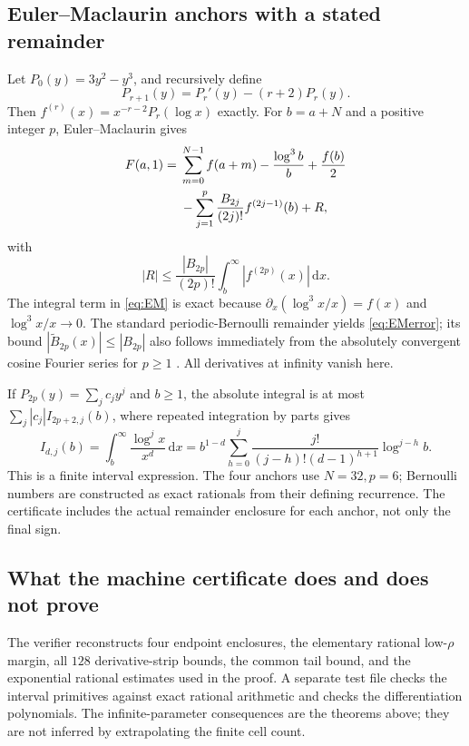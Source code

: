 \documentclass[11pt]{article}
\numberwithin{equation}{section}
\theoremstyle{definition}
\newcommand{\dd}{\,\mathrm d}
\begin{document}
\subsection{Euler--Maclaurin anchors with a stated remainder}
Let $P_0(y)=3y^2-y^3$, and recursively define
\begin{equation}\label{eq:polyrec}
 P_{r+1}(y)=P_r'(y)-(r+2)P_r(y).
\end{equation}
Then $f^{(r)}(x)=x^{-r-2}P_r(\log x)$ exactly.
For $b=a+N$ and a positive integer $p$, Euler--Maclaurin gives
\begin{align}\label{eq:EM}
 F(a,1)={}&\sum_{m=0}^{N-1}f(a+m)-\frac{\log^3b}{b}
 +\frac{f(b)}2\notag\\
 &-\sum_{j=1}^p\frac{B_{2j}}{(2j)!}f^{(2j-1)}(b)+R,
\end{align}
with
\begin{equation}\label{eq:EMerror}
 |R|\leq\frac{|B_{2p}|}{(2p)!}
                 \int_b^\infty |f^{(2p)}(x)|\dd x.
\end{equation}
The integral term in \eqref{eq:EM} is exact because
$\partial_x(\log^3x/x)=f(x)$ and $\log^3x/x\to0$.
The standard periodic-Bernoulli remainder yields \eqref{eq:EMerror};
its bound $|\widetilde B_{2p}(x)|\leq|B_{2p}|$ also follows immediately
from the absolutely convergent cosine Fourier series for $p\geq1$
\cite{dlmf-em}. All derivatives at infinity vanish here.

If $P_{2p}(y)=\sum_j c_jy^j$ and $b\geq1$, the absolute integral is at
most $\sum_j|c_j|I_{2p+2,j}(b)$, where repeated integration by parts gives
\begin{equation}\label{eq:logintegral}
 I_{d,j}(b)=\int_b^\infty\frac{\log^jx}{x^d}\dd x
 =b^{1-d}\sum_{h=0}^j
   \frac{j!}{(j-h)!(d-1)^{h+1}}\log^{j-h}b.
\end{equation}
This is a finite interval expression. The four anchors use $N=32,p=6$;
Bernoulli numbers are constructed as exact rationals from their defining
recurrence. The certificate includes the actual remainder enclosure for
each anchor, not only the final sign.

\subsection{What the machine certificate does and does not prove}
The verifier reconstructs four endpoint enclosures, the elementary rational
low-$\rho$ margin, all $128$ derivative-strip bounds, the common tail bound,
and the exponential rational estimates used in the proof. A separate test
file checks the interval primitives against exact rational arithmetic and
checks the differentiation polynomials.
The infinite-parameter consequences are the theorems above; they are not
inferred by extrapolating the finite cell count.
\end{document}
